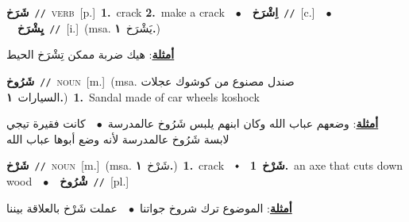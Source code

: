 \documentclass[10pt,a4paper,twoside]{article} %
\begin{document}
\begin{multicols}{2}
{\setlength\topsep{0pt}\textbf{\foreignlanguage{arabic}{شَرَخ}}\ {\color{gray}\texttt{//}\color{black}}\ \textsc{verb}\ [p.]\ \textbf{1.}~crack  \textbf{2.}~make a crack\ \ $\bullet$\ \ \setlength\topsep{0pt}\textbf{\foreignlanguage{arabic}{اِشْرَخ}}\ {\color{gray}\texttt{//}\color{black}}\ [c.]\ \ $\bullet$\ \ \setlength\topsep{0pt}\textbf{\foreignlanguage{arabic}{يِشْرَخ}}\ {\color{gray}\texttt{//}\color{black}}\ [i.]\ \color{gray}(msa. \foreignlanguage{arabic}{يَشْرَخ}~\foreignlanguage{arabic}{\textbf{١.}})\color{black}\  \begin{flushright}\color{gray}\foreignlanguage{arabic}{\textbf{\underline{\foreignlanguage{arabic}{أمثلة}}}: هيك ضربة ممكن تِشْرَخ الحيط}\end{flushright}\color{black}} \vspace{2mm}

{\setlength\topsep{0pt}\textbf{\foreignlanguage{arabic}{شَرُوخ}}\ {\color{gray}\texttt{//}\color{black}}\ \textsc{noun}\ [m.]\ \color{gray}(msa. \foreignlanguage{arabic}{صندل مصنوع من كوشوك عجلات السيارات}~\foreignlanguage{arabic}{\textbf{١.}})\color{black}\ \textbf{1.}~Sandal made of car wheels koshock\  \begin{flushright}\color{gray}\foreignlanguage{arabic}{\textbf{\underline{\foreignlanguage{arabic}{أمثلة}}}: وضعهم عباب الله وكان ابنهم يلبس شَرُوخ عالمدرسة\ $\bullet$\ \  كانت فقيرة تيجي لابسة شَرُوخ عالمدرسة لأنه وضع أبوها عباب الله}\end{flushright}\color{black}} \vspace{2mm}

{\setlength\topsep{0pt}\textbf{\foreignlanguage{arabic}{شَرْخ}}\ {\color{gray}\texttt{//}\color{black}}\ \textsc{noun}\ [m.]\ \color{gray}(msa. \foreignlanguage{arabic}{شَرْخ}~\foreignlanguage{arabic}{\textbf{١.}})\color{black}\ \textbf{1.}~crack\ \ $\smblkdiamond$\ \ \setlength\topsep{0pt}\textbf{\foreignlanguage{arabic}{شَرْخ}}\ \textbf{1.}~an axe that cuts down wood\ \ $\bullet$\ \ \setlength\topsep{0pt}\textbf{\foreignlanguage{arabic}{شْرُوخ}}\ {\color{gray}\texttt{//}\color{black}}\ [pl.]\  \begin{flushright}\color{gray}\foreignlanguage{arabic}{\textbf{\underline{\foreignlanguage{arabic}{أمثلة}}}: الموضوع ترك شروخ جواتنا\ $\bullet$\ \  عملت شَرْخ بالعلاقة بيننا}\end{flushright}\color{black}} \vspace{2mm}


\end{multicols}
\end{document}
